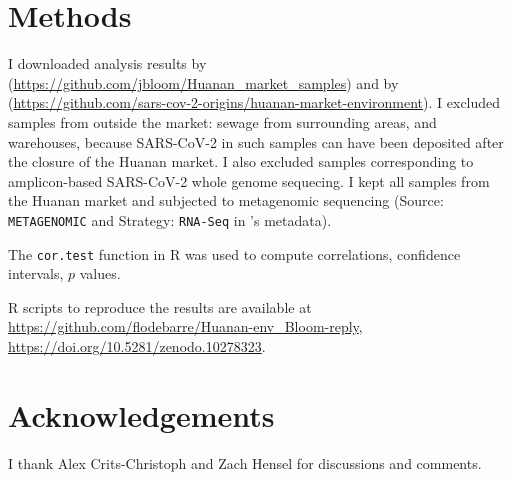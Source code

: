 \documentclass[11pt]{article}
\def \sct {\mbox{SARS-CoV-2}}
\begin{document}
\section{Methods}
I downloaded analysis results by \citet{Bloom2023VE} (\url{https://github.com/jbloom/Huanan_market_samples}) and by \citet{ACC2023bioRxiv} (\url{https://github.com/sars-cov-2-origins/huanan-market-environment}). I excluded samples from outside the market: sewage from surrounding areas, and warehouses, because \sct{} in such samples can have been deposited after the closure of the Huanan market. I also excluded samples corresponding to amplicon-based \sct{} whole genome sequecing. I kept all samples from the Huanan market and subjected to metagenomic sequencing (Source: \texttt{METAGENOMIC} and Strategy: \texttt{RNA-Seq} in \citet{Liu2023Nature}'s metadata).  

The \texttt{cor.test} function in R was used to compute correlations, confidence intervals, $p$ values.

R scripts to reproduce the results are available at \url{https://github.com/flodebarre/Huanan-env_Bloom-reply}, \url{https://doi.org/10.5281/zenodo.10278323}.


\section{Acknowledgements} I thank Alex Crits-Christoph and Zach Hensel for discussions and comments. 

%
%
\end{document}
